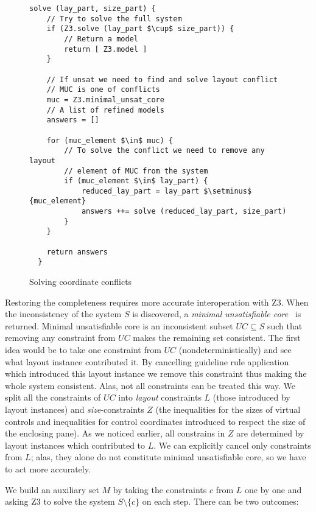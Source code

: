 \begin{figure*}
\begin{lstlisting}[language=algo,mathescape=true,basicstyle=\ttfamily]
  solve (lay_part, size_part) {
    // Try to solve the full system
    if (Z3.solve (lay_part $\cup$ size_part)) {
        // Return a model
        return [ Z3.model ]
    }

    // If unsat we need to find and solve layout conflict
    // MUC is one of conflicts
    muc = Z3.minimal_unsat_core
    // A list of refined models
    answers = []

    for (muc_element $\in$ muc) {
        // To solve the conflict we need to remove any layout
        // element of MUC from the system
        if (muc_element $\in$ lay_part) {
            reduced_lay_part = lay_part $\setminus$ {muc_element}
            answers ++= solve (reduced_lay_part, size_part)
        }
    }

    return answers
  }
\end{lstlisting}
\caption{Solving coordinate conflicts}
\label{Z3op}
\end{figure*}

Restoring the completeness requires more accurate interoperation with \textsc{Z3}. When the inconsistency of the system
$S$ is discovered, a \emph{minimal unsatisfiable core}~\cite{minUnsatCore} is returned.
Minimal unsatisfiable core is an inconsistent subset $UC\subseteq S$ such that removing any constraint from $UC$
makes the remaining set consistent. The first idea would be to take one constraint from $UC$ (nondeterministically) and
see what layout instance contributed it. By cancelling guideline rule application which introduced this
layout instance we remove this constraint thus making the whole system consistent. Alas, not all constraints can
be treated this way. We split all the constraints of $UC$ into \emph{layout} constraints $L$ (those
introduced by layout instances) and \emph{size}-constraints $Z$ (the inequalities for the sizes of virtual controls and
inequalities for control coordinates introduced to respect the size of the enclosing pane). As we noticed earlier,
all constrains in $Z$ are determined by layout instances which contributed to $L$. We can explicitly cancel only
constraints from $L$; alas, they alone do not constitute minimal unsatisfiable core, so we have to act more accurately.

We build an auxiliary set $M$ by taking the constraints $c$ from $L$ one by one and asking \textsc{Z3} to solve the system $S\setminus\{c\}$ on each step.
There can be two outcomes:

